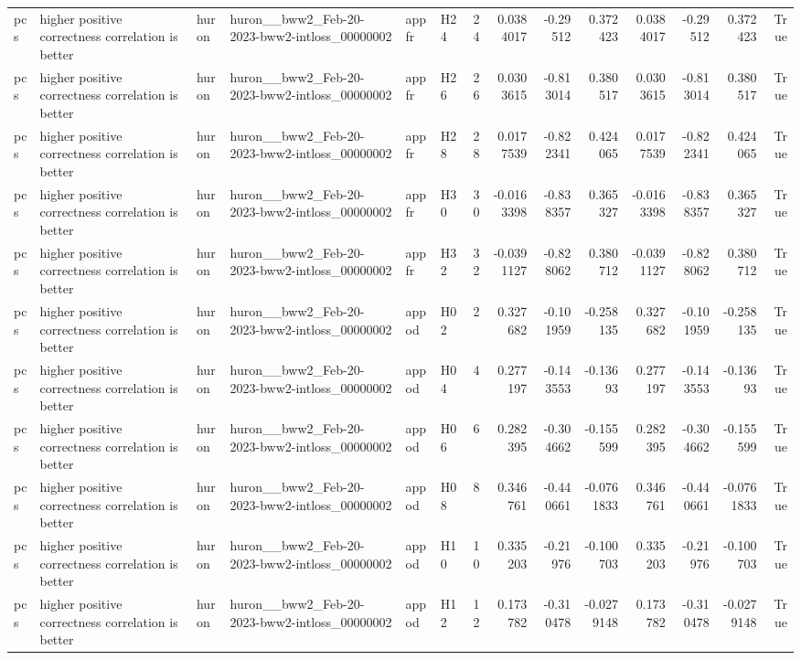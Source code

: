 \begin{longtable}{llllllrrrrrrrr}
pcs & higher positive correctness correlation is better & huron & huron\_\_bww2\_Feb-20-2023-bww2-intloss\_00000002 & appfr & H24 & 24 & 0.0384017 & -0.29512 & 0.372423 & 0.0384017 & -0.29512 & 0.372423 & True \\
pcs & higher positive correctness correlation is better & huron & huron\_\_bww2\_Feb-20-2023-bww2-intloss\_00000002 & appfr & H26 & 26 & 0.0303615 & -0.813014 & 0.380517 & 0.0303615 & -0.813014 & 0.380517 & True \\
pcs & higher positive correctness correlation is better & huron & huron\_\_bww2\_Feb-20-2023-bww2-intloss\_00000002 & appfr & H28 & 28 & 0.0177539 & -0.822341 & 0.424065 & 0.0177539 & -0.822341 & 0.424065 & True \\
pcs & higher positive correctness correlation is better & huron & huron\_\_bww2\_Feb-20-2023-bww2-intloss\_00000002 & appfr & H30 & 30 & -0.0163398 & -0.838357 & 0.365327 & -0.0163398 & -0.838357 & 0.365327 & True \\
pcs & higher positive correctness correlation is better & huron & huron\_\_bww2\_Feb-20-2023-bww2-intloss\_00000002 & appfr & H32 & 32 & -0.0391127 & -0.828062 & 0.380712 & -0.0391127 & -0.828062 & 0.380712 & True \\
pcs & higher positive correctness correlation is better & huron & huron\_\_bww2\_Feb-20-2023-bww2-intloss\_00000002 & appod & H02 & 2 & 0.327682 & -0.101959 & -0.258135 & 0.327682 & -0.101959 & -0.258135 & True \\
pcs & higher positive correctness correlation is better & huron & huron\_\_bww2\_Feb-20-2023-bww2-intloss\_00000002 & appod & H04 & 4 & 0.277197 & -0.143553 & -0.13693 & 0.277197 & -0.143553 & -0.13693 & True \\
pcs & higher positive correctness correlation is better & huron & huron\_\_bww2\_Feb-20-2023-bww2-intloss\_00000002 & appod & H06 & 6 & 0.282395 & -0.304662 & -0.155599 & 0.282395 & -0.304662 & -0.155599 & True \\
pcs & higher positive correctness correlation is better & huron & huron\_\_bww2\_Feb-20-2023-bww2-intloss\_00000002 & appod & H08 & 8 & 0.346761 & -0.440661 & -0.0761833 & 0.346761 & -0.440661 & -0.0761833 & True \\
pcs & higher positive correctness correlation is better & huron & huron\_\_bww2\_Feb-20-2023-bww2-intloss\_00000002 & appod & H10 & 10 & 0.335203 & -0.21976 & -0.100703 & 0.335203 & -0.21976 & -0.100703 & True \\
pcs & higher positive correctness correlation is better & huron & huron\_\_bww2\_Feb-20-2023-bww2-intloss\_00000002 & appod & H12 & 12 & 0.173782 & -0.310478 & -0.0279148 & 0.173782 & -0.310478 & -0.0279148 & True \\

\end{longtable}
